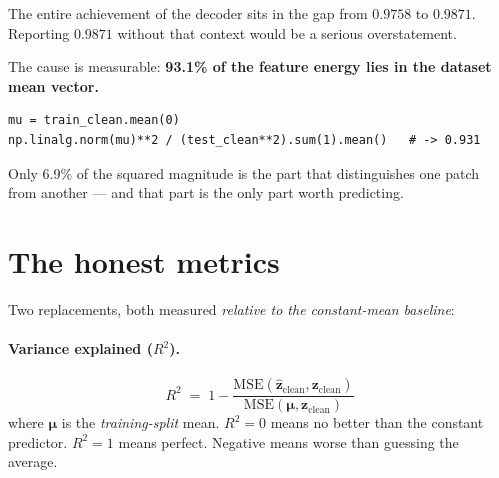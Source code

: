 \documentclass[11pt,a4paper]{report}
\newcommand{\zc}{\mathbf{z}_{\text{clean}}}
\newcommand{\zh}{\hat{\mathbf{z}}_{\text{clean}}}
\begin{document}
\begin{center}
\end{center}

The entire achievement of the decoder sits in the gap from $0.9758$ to $0.9871$.
Reporting $0.9871$ without that context would be a serious overstatement.

\begin{codedoes}
The cause is measurable: \textbf{93.1\% of the feature energy lies in the dataset
mean vector.}
\begin{lstlisting}
mu = train_clean.mean(0)
np.linalg.norm(mu)**2 / (test_clean**2).sum(1).mean()   # -> 0.931
\end{lstlisting}
Only 6.9\% of the squared magnitude is the part that distinguishes one patch
from another --- and that part is the only part worth predicting.
\end{codedoes}

\section{The honest metrics}

Two replacements, both measured \emph{relative to the constant-mean baseline}:

\paragraph{Variance explained ($R^2$).}
\[
R^2 \;=\; 1 - \frac{\mathrm{MSE}(\zh, \zc)}{\mathrm{MSE}(\boldsymbol{\mu}, \zc)}
\]
where $\boldsymbol\mu$ is the \emph{training-split} mean. $R^2 = 0$ means no
better than the constant predictor. $R^2 = 1$ means perfect. Negative means
worse than guessing the average.
\end{document}
